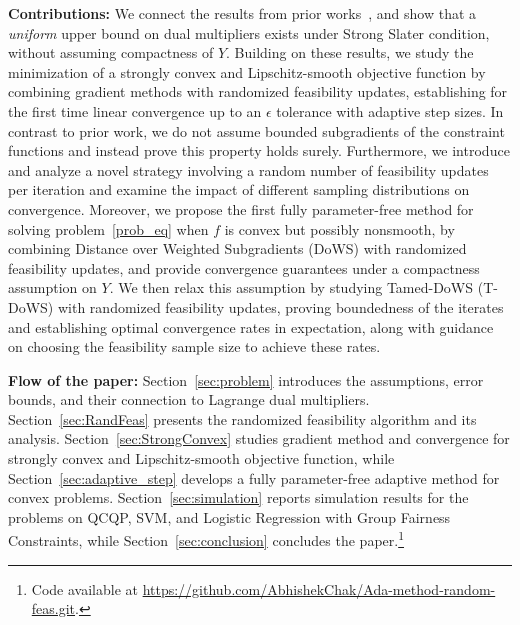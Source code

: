 \documentclass{article}
\def\an#1{{\color{magenta} #1}}
\theoremstyle{plain}
\theoremstyle{definition}
\theoremstyle{remark}
\begin{document}
\noindent \textbf{Contributions:}
We connect the results from prior works~\cite{lewis1998error, bertsekas1999note, mangasarian1998error}, and show that a \emph{uniform} upper bound on dual multipliers exists under Strong Slater condition, without assuming compactness of $Y$.
%
Building on these results, we study the minimization of a strongly convex and Lipschitz-smooth objective function by combining gradient methods with randomized feasibility updates, establishing for the first time linear convergence up to an $\epsilon$ tolerance with adaptive step sizes. In contrast to prior work, we do not assume bounded subgradients of the constraint functions and instead prove this property holds surely. Furthermore, we introduce and analyze a novel strategy involving a random number of feasibility updates per iteration and examine the impact of different sampling distributions on convergence. Moreover, we propose the first fully parameter-free method for solving problem~\eqref{prob_eq} when $f$ is convex but possibly nonsmooth, by combining Distance over Weighted Subgradients (DoWS) with randomized feasibility updates, and provide convergence guarantees under a compactness assumption on $Y$. We then relax this assumption by studying Tamed-DoWS (T-DoWS) with randomized feasibility updates, proving boundedness of the iterates and establishing optimal convergence rates in expectation, along with guidance on choosing the feasibility sample size to achieve these rates. %



\noindent \textbf{Flow of the paper:} Section~\ref{sec:problem} introduces the assumptions, error bounds, and their connection to Lagrange dual multipliers. Section~\ref{sec:RandFeas} presents the randomized feasibility algorithm and its analysis. Section~\ref{sec:StrongConvex} studies gradient method and convergence for strongly convex and Lipschitz-smooth objective function, while Section~\ref{sec:adaptive_step} develops a fully parameter-free adaptive method for convex problems. Section~\ref{sec:simulation} reports simulation results for the problems on QCQP, SVM, and Logistic
Regression with Group Fairness Constraints, while Section~\ref{sec:conclusion} concludes the paper.\footnote{Code available at \url{https://github.com/AbhishekChak/Ada-method-random-feas.git}.}
\end{document}
